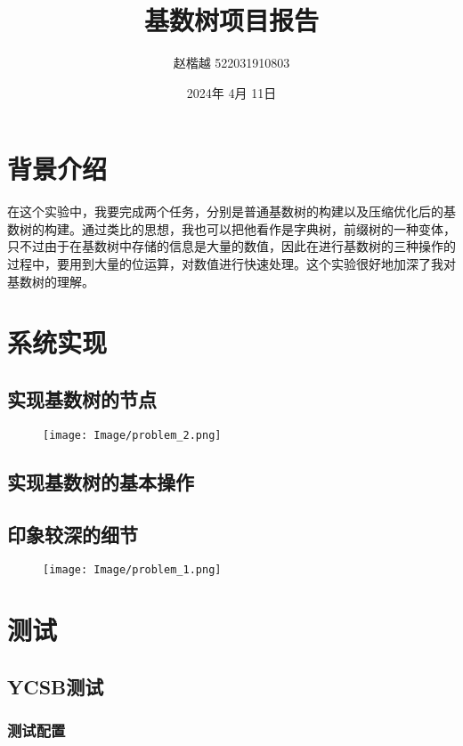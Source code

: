 \documentclass[]{article}
\title{基数树项目报告}
\author{赵楷越 522031910803}
\date{2024年 4月 11日}
\begin{document}
\maketitle
    
\section{背景介绍}
在这个实验中，我要完成两个任务，分别是普通基数树的构建以及压缩优化后的基数树的构建。通过类比的思想，我也可以把他看作是字典树，前缀树的一种变体，只不过由于在基数树中存储的信息是大量的数值，因此在进行基数树的三种操作的过程中，要用到大量的位运算，对数值进行快速处理。这个实验很好地加深了我对基数树的理解。

\section{系统实现}

\subsection{实现基数树的节点}

\begin{figure}[H]
    \centering
    \texttt{[image: Image/problem\_2.png]}
\end{figure}


\subsection{实现基数树的基本操作}


\subsection{印象较深的细节}

\begin{figure}[H]
    \centering
    \texttt{[image: Image/problem\_1.png]}
\end{figure}


\section{测试}

\subsection{YCSB测试}

\subsubsection{测试配置}
\end{document}
